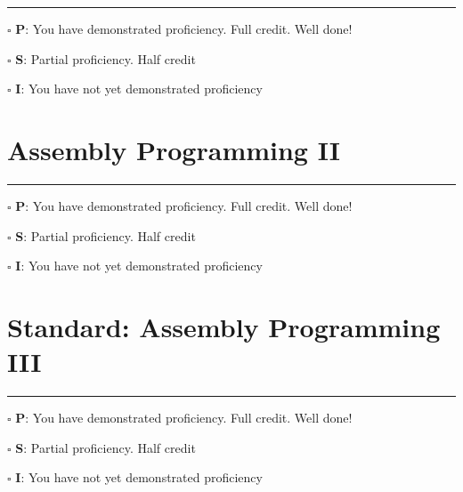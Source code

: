 \documentclass[12pt]{article}
\begin{document}
\vfill

\rule[1ex]{\textwidth}{.1pt}

$\square$ \textbf{P}: You have demonstrated proficiency. Full credit. Well done!

$\square$ \textbf{S}: Partial proficiency. Half credit

$\square$ \textbf{I}: You have not yet demonstrated proficiency

\newpage



\section*{Assembly Programming II}

\vfill

\rule[1ex]{\textwidth}{.1pt}

$\square$ \textbf{P}: You have demonstrated proficiency. Full credit. Well done!

$\square$ \textbf{S}: Partial proficiency. Half credit

$\square$ \textbf{I}: You have not yet demonstrated proficiency

\newpage

\section*{Standard: Assembly Programming III}


\vfill

\rule[1ex]{\textwidth}{.1pt}

$\square$ \textbf{P}: You have demonstrated proficiency. Full credit. Well done!

$\square$ \textbf{S}: Partial proficiency. Half credit

$\square$ \textbf{I}: You have not yet demonstrated proficiency

\newpage
\end{document}

